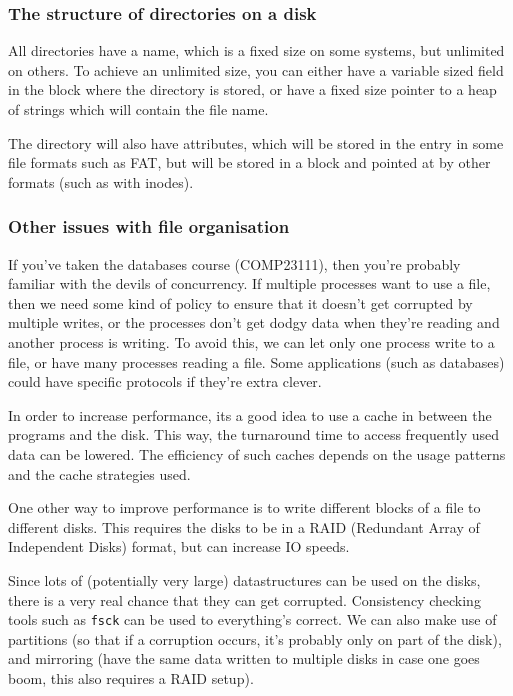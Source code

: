 \subsubsection{The structure of directories on a disk}

All directories have a name, which is a fixed size on some systems, but
unlimited on others. To achieve an unlimited size, you can either have a
variable sized field in the block where the directory is stored, or have a fixed
size pointer to a heap of strings which will contain the file name.

The directory will also have attributes, which will be stored in the entry in
some file formats such as FAT, but will be stored in a block and pointed at by
other formats (such as with inodes).

\subsubsection{Other issues with file organisation}

If you've taken the databases course (COMP23111), then you're probably familiar
with the devils of concurrency. If multiple processes want to use a file, then
we need some kind of policy to ensure that it doesn't get corrupted by multiple
writes, or the processes don't get dodgy data when they're reading and another
process is writing. To avoid this, we can let only one process write to a file,
or have many processes reading a file. Some applications (such as databases)
could have specific protocols if they're extra clever.

In order to increase performance, its a good idea to use a cache in between the
programs and the disk. This way, the turnaround time to access frequently used
data can be lowered. The efficiency of such caches depends on the usage patterns
and the cache strategies used.

One other way to improve performance is to write different blocks of a file to
different disks. This requires the disks to be in a RAID (Redundant Array of
Independent Disks) format, but can increase IO speeds.

Since lots of (potentially very large) datastructures can be used on the disks,
there is a very real chance that they can get corrupted. Consistency checking
tools such as \texttt{fsck} can be used to everything's correct. We can also
make use of partitions (so that if a corruption occurs, it's probably only on
part of the disk), and mirroring (have the same data written to multiple disks
in case one goes boom, this also requires a RAID setup).

